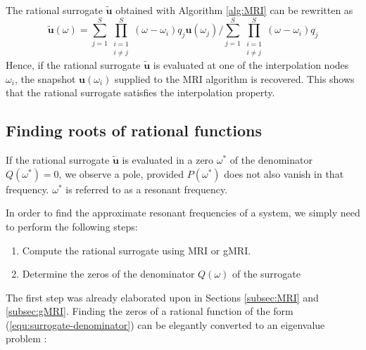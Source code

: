 \documentclass[11pt, a4paper]{article}
\begin{document}
The rational surrogate $\mathbf{\tilde{u}}$ obtained with Algorithm \ref{alg:MRI}
can be rewritten as
\begin{equation}
    \mathbf{\tilde{u}}(\omega)
    = \sum_{j=1}^S \prod_{\substack{i=1 \\ i \neq j}}^S (\omega - \omega_i) q_j \mathbf{u}(\omega_j)
    / \sum_{j=1}^S \prod_{\substack{i=1 \\ i \neq j}}^S (\omega - \omega_i) q_j
\end{equation}
Hence, if the rational surrogate $\mathbf{\tilde{u}}$ is evaluated at one of the
interpolation nodes $\omega_i$, the snapshot $\mathbf{u}(\omega_i)$ supplied to 
the \acrshort{MRI} algorithm is recovered. This shows that the rational surrogate
satisfies the interpolation property.

\subsection{Finding roots of rational functions}
\label{subsec:roots}

If the rational surrogate $\mathbf{\tilde{u}}$ is evaluated in a zero
$\omega^\ast$ of the denominator $Q(\omega^\ast) = 0$, we observe a pole,
provided $P(\omega^\ast)$ does not also vanish in that frequency.
$\omega^\ast$ is referred to as a resonant frequency.

In order to find the approximate resonant frequencies of a system,
we simply need to perform the following steps:

\begin{enumerate}
    \item Compute the rational surrogate using \acrshort{MRI} or \acrshort{gMRI}.
    \item Determine the zeros of the denominator $Q(\omega)$ of the surrogate
\end{enumerate}

The first step was already elaborated upon in Sections \ref{subsec:MRI} and \ref{subsec:gMRI}.
Finding the zeros of a rational function of the form (\ref{equ:surrogate-denominator})
can be elegantly converted to an eigenvalue problem \citep{klein}:
\end{document}
